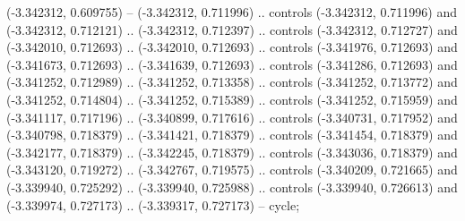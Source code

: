     (-3.342312, 0.609755) --
    (-3.342312, 0.711996) .. controls (-3.342312, 0.711996) and (-3.342312, 0.712121) ..
    (-3.342312, 0.712397) .. controls (-3.342312, 0.712727) and (-3.342010, 0.712693) ..
    (-3.342010, 0.712693) .. controls (-3.341976, 0.712693) and (-3.341673, 0.712693) ..
    (-3.341639, 0.712693) .. controls (-3.341286, 0.712693) and (-3.341252, 0.712989) ..
    (-3.341252, 0.713358) .. controls (-3.341252, 0.713772) and (-3.341252, 0.714804) ..
    (-3.341252, 0.715389) .. controls (-3.341252, 0.715959) and (-3.341117, 0.717196) ..
    (-3.340899, 0.717616) .. controls (-3.340731, 0.717952) and (-3.340798, 0.718379) ..
    (-3.341421, 0.718379) .. controls (-3.341454, 0.718379) and (-3.342177, 0.718379) ..
    (-3.342245, 0.718379) .. controls (-3.343036, 0.718379) and (-3.343120, 0.719272) ..
    (-3.342767, 0.719575) .. controls (-3.340209, 0.721665) and (-3.339940, 0.725292) ..
    (-3.339940, 0.725988) .. controls (-3.339940, 0.726613) and (-3.339974, 0.727173) ..
    (-3.339317, 0.727173) --
    cycle;


